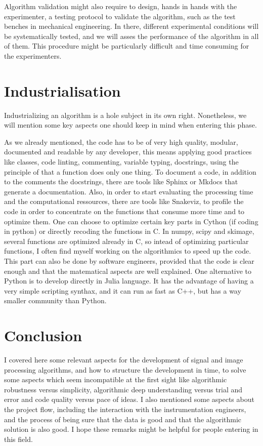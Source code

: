 \documentclass[24pt]{article}
\begin{document}
 
Algorithm validation might also require to design, hands in hands with the experimenter, a testing protocol to validate the algorithm, such as the test benches in mechanical engineering. In there, different experimental conditions will be systematically tested, and we will asses the performance of the algorithm in all of them. This procedure might be particularly difficult and time consuming for the experimenters.
  
  
 
 
\section{Industrialisation}

Industrializing an algorithm is a hole subject in its own right. Nonetheless, we will mention some key aspects one should keep in mind when entering this phase. 


As we already mentioned, the code has to be of very high quality, modular, documented and readable by any developer, this means applying  good practices  like classes, code linting, commenting, variable typing, docstrings, using the principle of that a function does only one thing.
To document a code, in addition to  the comments the docstrings, there are tools like Sphinx or Mkdocs that generate a documentation.  
Also, in order to start evaluating the processing time and the computational ressources,  there are tools like Snakeviz, to profile the code in order to concentrate on the functions that consume more time and to optimize them. One can choose to optimize certain key parts in Cython (if coding in python) or directly recoding the functions in C. In numpy, scipy and skimage, several functions are optimized already in C, so intead of optimizing particular functions, I often find myself working on the algorithmics to speed up the code.
This part can also be done by software engineers, provided that the code is clear enough and that the matematical aspects are well explained. One alternative to Python is to develop directly in Julia language. It has the advantage of having a very simple scripting synthax, and it can run as fast as C++, but has a way smaller community than Python.

\section{Conclusion}
I covered here some relevant aspects for   the development of signal and image processing algorithms, and how to structure the development in time, to solve some aspects which seem incompatible at the first sight like algorithmic robustness versus simplicity, algorithmic deep understanding versus trial and error  and code quality versus pace of ideas. I also mentioned some aspects about the project flow, including the interaction with  the instrumentation engineers, and the process of being sure that the data is good and that the algorithmic solution is also good. 
I hope these remarks might be helpful for people entering in this field.



\end{document}
